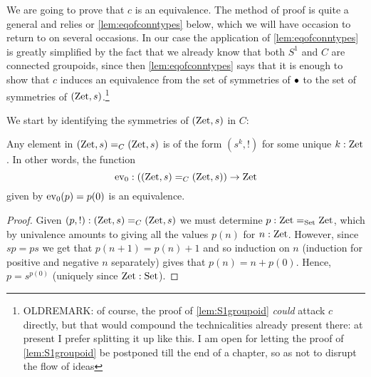 We are going to prove that $c$ is an equivalence.  The method of proof is quite a general and relies or  \cref{lem:eqofconntypes} below, which we will have occasion to return to on several occasions.  In our case the application of  \cref{lem:eqofconntypes} is greatly simplified by the fact that we already know that both $S^1$ and $C$ are connected groupoids, since then \cref{lem:eqofconntypes} says that it is enough to show that $c$ induces an equivalence from the set of symmetries of $\bullet$ to the set of symmetries of $(\mathrm{Zet},s)$.\footnote{OLDREMARK: of course, the proof of \cref{lem:S1groupoid} \emph{could} attack $c$ directly, but that would compound the technicalities already present there: at present I prefer splitting it up like this.  I am open for letting the proof of \cref{lem:S1groupoid} be postponed till the end of a chapter, so as not to disrupt the flow of ideas}

We start by identifying the symmetries of $(\mathrm{Zet},s)$ in $C$:

\begin{lemma}
  \label{lem:IdCisZet}
  Any element in $(\mathrm{Zet},s)=_C(\mathrm{Zet},s)$ is of the form $(s^k,!)$ for some unique $k:\mathrm{Zet}$.  In other words,
  the function 
$$\mathrm{ev}_0:((\mathrm{Zet},s)=_C(\mathrm{Zet},s))\to \mathrm{Zet}$$ given by $\mathrm{ev}_0(p)=p(0)$ is an equivalence.
\end{lemma}
\begin{proof}
  Given $(p,!):(\mathrm{Zet},s)=_C(\mathrm{Zet},s)$ we must determine $p:\mathrm{Zet}=_{\mathord{\mathrm{Set}}}\mathrm{Zet}$, which by univalence amounts to giving all the values $p(n)$ for $n:\mathrm{Zet}$.  However, since $sp=ps$ we get that $p(n+1)=p(n)+1$ and so induction on $n$ (induction for positive and negative $n$ separately) gives that $p(n)=n+p(0)$.  Hence, $p=s^{p(0)}$ (uniquely since $\mathrm{Zet}:\mathord{\mathrm{Set}}$).
\end{proof}


